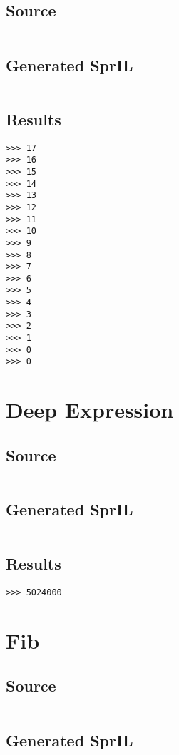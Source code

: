 \documentclass[twoside]{report}
\begin{document}
\subsection{Source}
\inputminted[tabsize=4,linenos,firstnumber=1]{text}{../test/cyclic_recursion.shl}
\subsection{Generated SprIL}
\inputminted[tabsize=4,linenos,firstnumber=0]{text}{../test/cyclic_recursion_gen.txt}
\subsection{Results}
\begin{verbatim}
>>> 17
>>> 16
>>> 15
>>> 14
>>> 13
>>> 12
>>> 11
>>> 10
>>> 9
>>> 8
>>> 7
>>> 6
>>> 5
>>> 4
>>> 3
>>> 2
>>> 1
>>> 0
>>> 0
\end{verbatim}

\section{Deep Expression}
\subsection{Source}
\inputminted[tabsize=4,linenos,firstnumber=1]{text}{../test/deep_expression.shl}
\subsection{Generated SprIL}
\inputminted[tabsize=4,linenos,firstnumber=0]{text}{../test/deep_expression_gen.txt}
\subsection{Results}
\begin{verbatim}
>>> 5024000
\end{verbatim}

\section{Fib}
\subsection{Source}
\inputminted[tabsize=4,linenos,firstnumber=1]{text}{../test/fib.shl}
\subsection{Generated SprIL}
\inputminted[tabsize=4,linenos,firstnumber=0]{text}{../test/fib_gen.txt}
\end{document}
